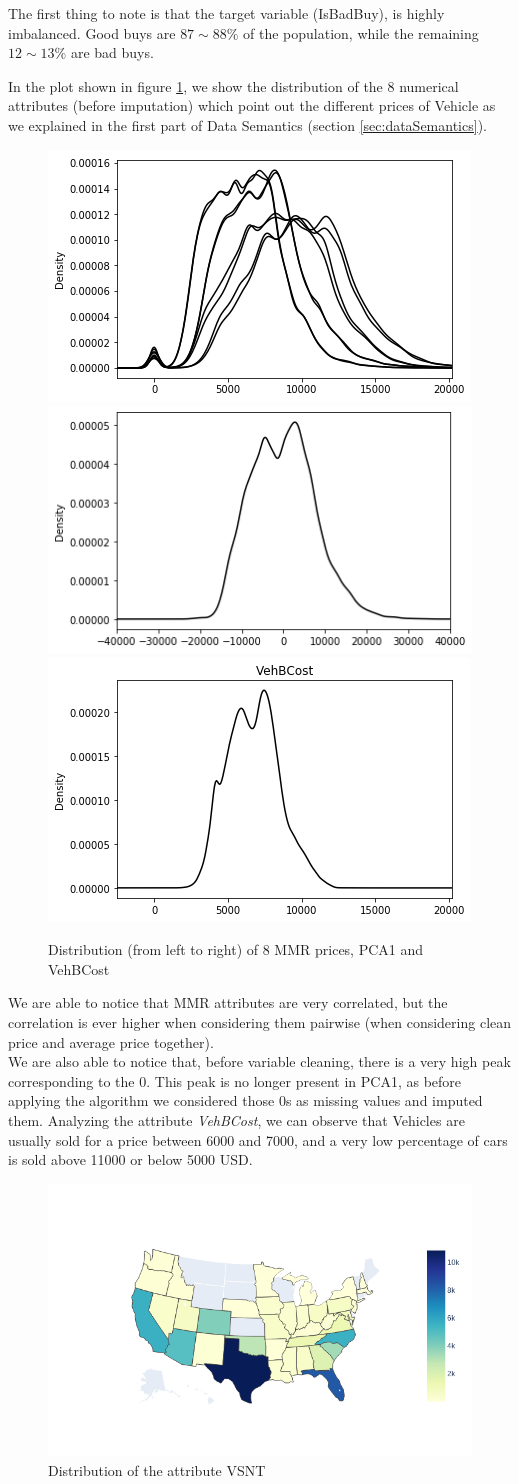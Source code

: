 \documentclass{article}
\begin{document}
	The first thing to note is that the target variable (IsBadBuy), is highly imbalanced. Good buys are $87\sim88 \%$ of the population, while the remaining $12\sim13 \%$ are bad buys.
	
	In the plot shown in figure \ref{fig:mmr}, we show the distribution of the 8 numerical attributes (before imputation) which point out the different prices of Vehicle as we explained in the first part of Data Semantics (section \ref{sec:dataSemantics}). 
	\begin{figure}[H]
		\centering
		\includegraphics[width=.32\textwidth]{index}\hfill
		\includegraphics[width=.32\textwidth]{PCA1} \hfill
		\includegraphics[width=.32\textwidth]{vehbcost}\hfill
		\caption{Distribution (from left to right) of 8 MMR prices, PCA1 and VehBCost}
		\label{fig:mmr}
	\end{figure}
	
	We are able to notice that MMR attributes are very correlated, but the correlation is ever higher when considering them pairwise (when considering clean price and average price together). \\
	We are also able to notice that, before variable cleaning, there is a very high peak corresponding to the 0. This peak is no longer present in PCA1, as before applying the algorithm we considered those 0s as missing values and imputed them. Analyzing the attribute \emph{VehBCost}, we can observe that Vehicles are usually sold for a price between 6000 and 7000, and a very low percentage of cars is sold above 11000 or below 5000 USD. 
	
	
	\begin{figure}[H]
		\centering
		\includegraphics[width=.5\textwidth]{newplot.png}
		\caption{{ Distribution of the attribute VSNT}}
	\end{figure}
	
\end{document}
